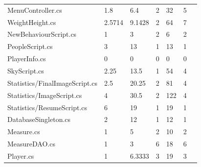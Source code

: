 \begin{table}[htp]
\begin{tabular}{lllllll}
MenuController.cs & 1.8\cellcolor[HTML]{9AFF99} & 6.4\cellcolor[HTML]{9AFF99} & 2\cellcolor[HTML]{FFFC9E} & 32\cellcolor[HTML]{9AFF99} & 5\cellcolor[HTML]{9AFF99} \\
WeightHeight.cs & 2.5714\cellcolor[HTML]{9AFF99} & 9.1428\cellcolor[HTML]{9AFF99} & 2\cellcolor[HTML]{FFFC9E} & 64\cellcolor[HTML]{9AFF99} & 7\cellcolor[HTML]{9AFF99} \\
NewBehaviourScript.cs & 1\cellcolor[HTML]{9AFF99} & 3\cellcolor[HTML]{9AFF99} & 2\cellcolor[HTML]{FFFC9E} & 6\cellcolor[HTML]{9AFF99} & 2\cellcolor[HTML]{9AFF99} \\
PeopleScript.cs & 3\cellcolor[HTML]{9AFF99} & 13\cellcolor[HTML]{FFCE93} & 1\cellcolor[HTML]{9AFF99} & 13\cellcolor[HTML]{9AFF99} & 1\cellcolor[HTML]{9AFF99} \\
PlayerInfo.cs & 0\cellcolor[HTML]{9AFF99} & 0\cellcolor[HTML]{9AFF99} & 0\cellcolor[HTML]{9AFF99} & 0\cellcolor[HTML]{9AFF99} & 0\cellcolor[HTML]{9AFF99} \\
SkyScript.cs & 2.25\cellcolor[HTML]{9AFF99} & 13.5\cellcolor[HTML]{FFCE93} & 1\cellcolor[HTML]{9AFF99} & 54\cellcolor[HTML]{9AFF99} & 4\cellcolor[HTML]{9AFF99} \\
Statistics/FinalImageScript.cs & 2.5\cellcolor[HTML]{9AFF99} & 20.25\cellcolor[HTML]{FFCE93} & 2\cellcolor[HTML]{FFFC9E} & 81\cellcolor[HTML]{FFFC9E} & 4\cellcolor[HTML]{9AFF99} \\
Statistics/ImageScript.cs & 4\cellcolor[HTML]{9AFF99} & 30.5\cellcolor[HTML]{FFCE93} & 2\cellcolor[HTML]{FFFC9E} & 122\cellcolor[HTML]{FFFC9E} & 4\cellcolor[HTML]{9AFF99} \\
Statistics/ResumeScript.cs & 6\cellcolor[HTML]{FFFC9E} & 19\cellcolor[HTML]{FFCE93} & 1\cellcolor[HTML]{9AFF99} & 19\cellcolor[HTML]{9AFF99} & 1\cellcolor[HTML]{9AFF99} \\
DatabaseSingleton.cs & 2\cellcolor[HTML]{9AFF99} & 12\cellcolor[HTML]{FFFC9E} & 1\cellcolor[HTML]{9AFF99} & 12\cellcolor[HTML]{9AFF99} & 1\cellcolor[HTML]{9AFF99} \\
Measure.cs & 1\cellcolor[HTML]{9AFF99} & 5\cellcolor[HTML]{9AFF99} & 2\cellcolor[HTML]{FFFC9E} & 10\cellcolor[HTML]{9AFF99} & 2\cellcolor[HTML]{9AFF99} \\
MeasureDAO.cs & 1\cellcolor[HTML]{9AFF99} & 3\cellcolor[HTML]{9AFF99} & 6\cellcolor[HTML]{FFCE93} & 18\cellcolor[HTML]{9AFF99} & 6\cellcolor[HTML]{9AFF99} \\
Player.cs & 1\cellcolor[HTML]{9AFF99} & 6.3333\cellcolor[HTML]{9AFF99} & 3\cellcolor[HTML]{FFFC9E} & 19\cellcolor[HTML]{9AFF99} & 3\cellcolor[HTML]{9AFF99} \\

\end{tabular}
\end{table}
